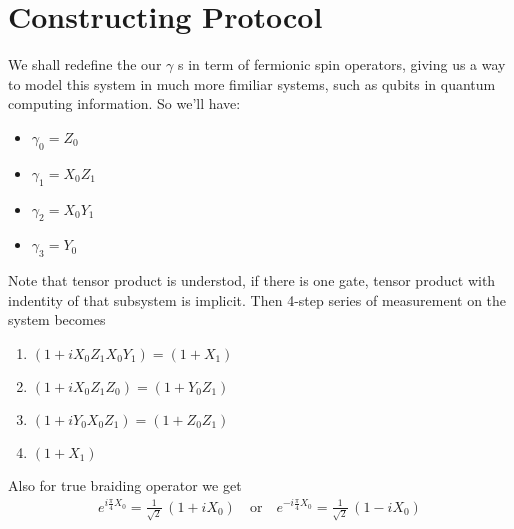 \documentclass{article}
\begin{document}

\section{Constructing Protocol} %
\label{sec:Constructing Protocol}
We shall redefine the our $ \gamma $ s in term of fermionic spin operators, giving us a way to model
this system in much more fimiliar systems, such as qubits in quantum computing information. So we'll have:
\begin{itemize}
	\item $ \gamma_0 = Z_0 $
	\item $ \gamma_1 = X_0 Z_1 $
	\item $ \gamma_2 = X_0 Y_1 $
	\item $ \gamma_3 = Y_0 $
\end{itemize}
Note that tensor product is understod, if there is one gate, tensor product with indentity of that subsystem is implicit.
Then 4-step series of measurement on the system becomes
\begin{enumerate}
	\item $ (1 + i X_0 Z_1 X_0 Y_1) = (1 + X_1) $
	\item $ (1 + i X_0 Z_1 Z_0) = (1 + Y_0 Z_1) $
	\item $ (1 + i Y_0 X_0 Z_1) = (1 + Z_0 Z_1) $
	\item $ (1 + X_1) $
\end{enumerate}
Also for true braiding operator we get
$$
	\begin{aligned}
		e^{i \frac{\pi}{4} X_0} = \frac{1}{\sqrt{2}}\, (1 + i X_0 ) \quad \text{or} \quad
		e^{-i \frac{\pi}{4} X_0} = \frac{1}{\sqrt{2}}\, (1 - i X_0 )
		\label{eq:br Jordan-Wigner}
	\end{aligned}
$$
\end{document}
